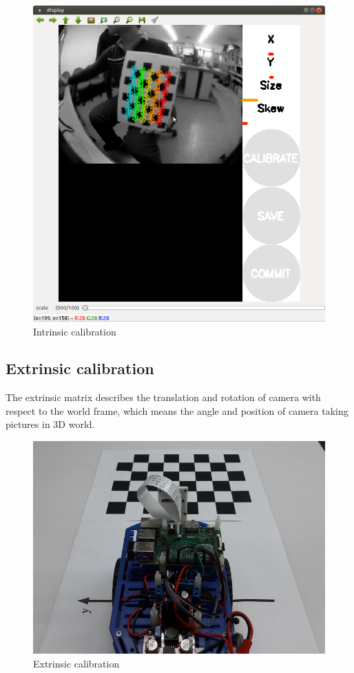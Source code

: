 \documentclass{article}
\begin{document}
\begin{figure}[ht]
  \label{fig:intrinsic_calibration}
  \centering
  \includegraphics[scale=0.5]{graphs/intrinsic_calibration.png}
  \caption{Intrinsic calibration}
\end{figure}
\FloatBarrier

\subsection{Extrinsic calibration}

The extrinsic matrix describes the translation and rotation of camera with respect to the world frame, which means the angle and position of camera taking pictures in 3D world.

\begin{figure}[ht]
  \label{fig:extrinsic_calibration}
  \centering
  \includegraphics[scale=0.7]{graphs/extrinsic_calibration.png}
  \caption{Extrinsic calibration}
\end{figure}
\FloatBarrier
\end{document}
